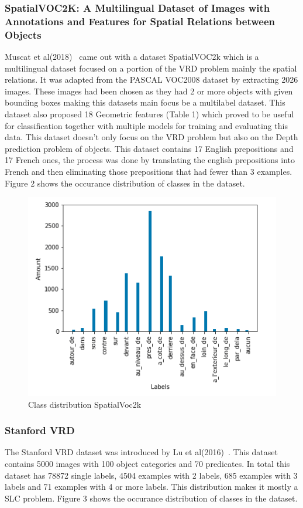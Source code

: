 \documentclass{csfyp}
\begin{document}
\subsubsection{SpatialVOC2K: A Multilingual Dataset of Images with Annotations and Features for Spatial Relations between Objects}
Muscat et al(2018)~\cite{belz-etal-2018-spatialvoc2k} came out with a dataset SpatialVOC2k which is a multilingual dataset focused on a portion of the VRD problem mainly the spatial relations. It was adapted from the PASCAL VOC2008 dataset by extracting 2026 images. These images had been chosen as they had 2 or more objects with given bounding boxes making this datasets main focus be a multilabel dataset. This dataset also proposed 18 Geometric features (Table 1) which proved to be useful for classification together with multiple models for training and evaluating this data. This dataset doesn’t only focus on the VRD problem but also on the Depth prediction problem of objects. This dataset contains 17 English prepositions and 17 French ones, the process was done by translating the english prepositions into French and then eliminating those prepositions that had fewer than 3 examples. Figure 2 shows the occurance distribution of classes in the dataset.

\begin{figure}[!htbp]
	\includegraphics[scale=0.60,center]{SV2k.pdf}
	\caption{Class distribution SpatialVoc2k}
\end{figure}

\subsubsection{Stanford VRD}
The Stanford VRD dataset was introduced by Lu et al(2016)~\cite{lu2016visual}. This dataset contains 5000 images with 100 object categories and 70 predicates. In total this dataset has 78872 single labels, 4504 examples with 2 labels,
685 examples with 3 labels and 71 examples with 4 or more labels. This distribution makes it mostly a SLC problem. Figure 3 shows the occurance distribution of classes in the dataset.
\end{document}
